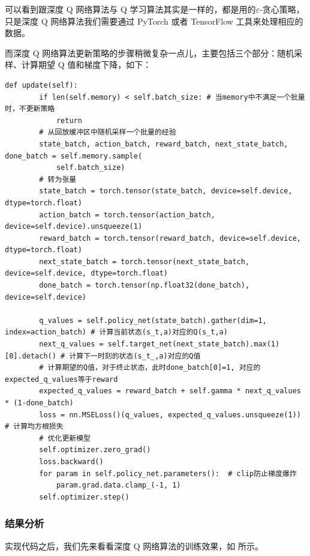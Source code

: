 可以看到跟深度 Q 网络算法与 Q 学习算法其实是一样的，都是用的$\varepsilon$-贪心策略，只是深度 Q 网络算法我们需要通过 PyTorch 或者 TensorFlow 工具来处理相应的数据。

而深度 Q 网络算法更新策略的步骤稍微复杂一点儿，主要包括三个部分：随机采样、计算期望 Q 值和梯度下降，如下：

\begin{lstlisting}[style=Python]
    def update(self):
        if len(self.memory) < self.batch_size: # 当memory中不满足一个批量时，不更新策略
            return
        # 从回放缓冲区中随机采样一个批量的经验
        state_batch, action_batch, reward_batch, next_state_batch, done_batch = self.memory.sample(
            self.batch_size)
        # 转为张量
        state_batch = torch.tensor(state_batch, device=self.device, dtype=torch.float)
        action_batch = torch.tensor(action_batch, device=self.device).unsqueeze(1)  
        reward_batch = torch.tensor(reward_batch, device=self.device, dtype=torch.float)  
        next_state_batch = torch.tensor(next_state_batch, device=self.device, dtype=torch.float)
        done_batch = torch.tensor(np.float32(done_batch), device=self.device)
        
        q_values = self.policy_net(state_batch).gather(dim=1, index=action_batch) # 计算当前状态(s_t,a)对应的Q(s_t,a)
        next_q_values = self.target_net(next_state_batch).max(1)[0].detach() # 计算下一时刻的状态(s_t_,a)对应的Q值
        # 计算期望的Q值，对于终止状态，此时done_batch[0]=1, 对应的expected_q_values等于reward
        expected_q_values = reward_batch + self.gamma * next_q_values * (1-done_batch)
        loss = nn.MSELoss()(q_values, expected_q_values.unsqueeze(1))  # 计算均方根损失
        # 优化更新模型
        self.optimizer.zero_grad()  
        loss.backward()
        for param in self.policy_net.parameters():  # clip防止梯度爆炸
            param.grad.data.clamp_(-1, 1)
        self.optimizer.step() 
\end{lstlisting}

\subsubsection{结果分析}

实现代码之后，我们先来看看深度 Q 网络算法的训练效果，如 所示。

